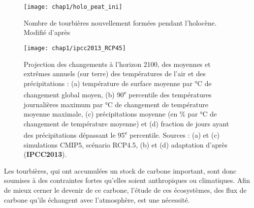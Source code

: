 \begin{figure}
\centering
\texttt{[image: chap1/holo\_peat\_ini]}
\caption{Nombre de tourbières nouvellement formées pendant l'holocène. Modifié d'après \citep{macdonald2006}}
\label{fig:holo_peat_ini}
\end{figure}


\begin{figure}
\centering
\texttt{[image: chap1/ipcc2013\_RCP45]}
\caption{Projection des changements à l'horizon 2100, des moyennes et extrêmes annuels (sur terre) des températures de l'air et des précipitations : (a) température de surface moyenne par \si{\degreeCelsius} de changement global moyen, (b) 90\textsuperscript{e} percentile des températures journalières maximum par \si{\degreeCelsius} de changement de température moyenne maximale, (c) précipitations moyenne (en \si{\percent} par \si{\degreeCelsius} de changement de température moyenne) et (d) fraction de jours ayant des précipitations dépassant le 95\textsuperscript{e} percentile. Sources : (a) et (c) simulations CMIP5, scénario RCP4.5, (b) et (d) adaptation d'après \citet{orlowsky2012}(\textbf{IPCC2013}).}
\label{fig:ipcc2013_T_rain}
\end{figure}


Les tourbières, qui ont accumulées un stock de carbone important, sont donc soumises à des contraintes fortes qu'elles soient anthropiques ou climatiques.
Afin de mieux cerner le devenir de ce carbone, l'étude de ces écosystèmes, des flux de carbone qu'ils échangent avec l'atmosphère, est une nécessité.

